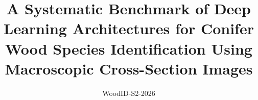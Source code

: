 \documentclass[10pt]{article}
\begin{document}
\title{A Systematic Benchmark of Deep Learning Architectures for Conifer
Wood Species Identification Using Macroscopic Cross-Section Images}
\author{WoodID-S2-2026}
\maketitle

















\end{document}
